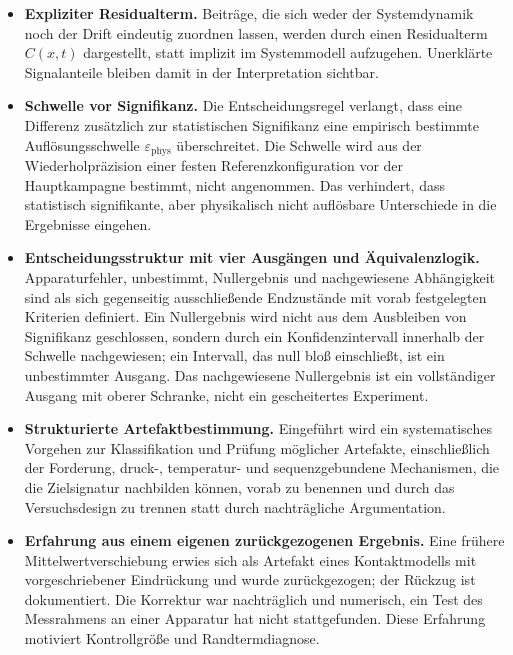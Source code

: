 \documentclass[12pt,a4paper]{report}
\begin{document}
\begin{itemize}
  \item \textbf{Expliziter Residualterm.}
        Beiträge, die sich weder der Systemdynamik noch der Drift
        eindeutig zuordnen lassen, werden durch einen Residualterm
        $C(x,t)$ dargestellt, statt implizit im Systemmodell
        aufzugehen. Unerklärte Signalanteile bleiben damit in der
        Interpretation sichtbar.

  \item \textbf{Schwelle vor Signifikanz.}
        Die Entscheidungsregel verlangt, dass eine Differenz zusätzlich
        zur statistischen Signifikanz eine empirisch bestimmte
        Auflösungsschwelle $\varepsilon_{\mathrm{phys}}$ überschreitet.
        Die Schwelle wird aus der Wiederholpräzision einer festen
        Referenzkonfiguration vor der Hauptkampagne bestimmt, nicht
        angenommen. Das verhindert, dass statistisch signifikante, aber
        physikalisch nicht auflösbare Unterschiede in die Ergebnisse
        eingehen.

  \item \textbf{Entscheidungsstruktur mit vier Ausgängen und
        Äquivalenzlogik.}
        Apparaturfehler, unbestimmt, Nullergebnis und nachgewiesene
        Abhängigkeit sind als sich gegenseitig ausschließende Endzustände
        mit vorab festgelegten Kriterien definiert. Ein Nullergebnis
        wird nicht aus dem Ausbleiben von Signifikanz geschlossen,
        sondern durch ein Konfidenzintervall innerhalb der Schwelle
        nachgewiesen; ein Intervall, das null bloß einschließt, ist ein
        unbestimmter Ausgang. Das nachgewiesene Nullergebnis ist ein
        vollständiger Ausgang mit oberer Schranke, nicht ein
        gescheitertes Experiment.

  \item \textbf{Strukturierte Artefaktbestimmung.}
        Eingeführt wird ein systematisches Vorgehen zur Klassifikation
        und Prüfung möglicher Artefakte, einschließlich der Forderung,
        druck-, temperatur- und sequenzgebundene Mechanismen, die die
        Zielsignatur nachbilden können, vorab zu benennen und durch das
        Versuchsdesign zu trennen statt durch nachträgliche Argumentation.

  \item \textbf{Erfahrung aus einem eigenen zurückgezogenen Ergebnis.}
        Eine frühere Mittelwertverschiebung erwies sich als Artefakt
        eines Kontaktmodells mit vorgeschriebener Eindrückung und wurde
        zurückgezogen; der Rückzug ist dokumentiert. Die Korrektur war
        nachträglich und numerisch, ein Test des Messrahmens an einer
        Apparatur hat nicht stattgefunden. Diese Erfahrung motiviert
        Kontrollgröße und Randtermdiagnose.

\end{itemize}
\end{document}
